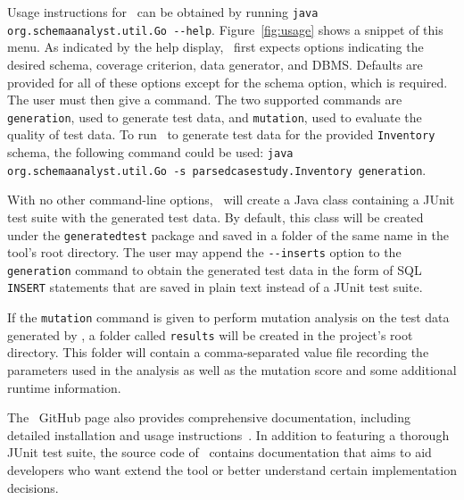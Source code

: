 Usage instructions for \sa~can be obtained by running \lstinline{java org.schemaanalyst.util.Go --help}.
Figure~\ref{fig:usage} shows a snippet of this menu.  As indicated by the help display, \sa~first expects options
indicating the desired schema, coverage criterion, data generator, and DBMS\@. Defaults are provided for all of these
options except for the schema option, which is required. The user must then give a command.  The two supported commands
are \lstinline{generation}, used to generate test data, and \lstinline{mutation}, used to evaluate the quality of test
data.  To run \sa~to generate test data for the provided \texttt{Inventory} schema, the following command could be used:
\lstinline{java org.schemaanalyst.util.Go -s parsedcasestudy.Inventory generation}.


With no other command-line options, \sa~will create a Java class containing a JUnit test suite with the generated test
data. By default, this class will be created under the \texttt{generatedtest} package and saved in a folder of the same
name in the tool's root directory.  The user may append the \lstinline{--inserts} option to the \lstinline{generation}
command to obtain the generated test data in the form of SQL \texttt{INSERT} statements that are saved in plain text
instead of a JUnit test suite.




If the \lstinline{mutation} command is given to perform mutation analysis on the test data generated by \sa, a folder
called \lstinline{results} will be created in the project's root directory. This folder will contain a comma-separated
value file recording the parameters used in the analysis as well as the mutation score and some additional runtime
information.


The \sa~GitHub page also provides comprehensive documentation, including detailed installation and usage
instructions~\cite{tool}. In addition to featuring a thorough JUnit test suite, the source code of \sa~contains
documentation that aims to aid developers who want extend the tool or better understand certain implementation
decisions.



